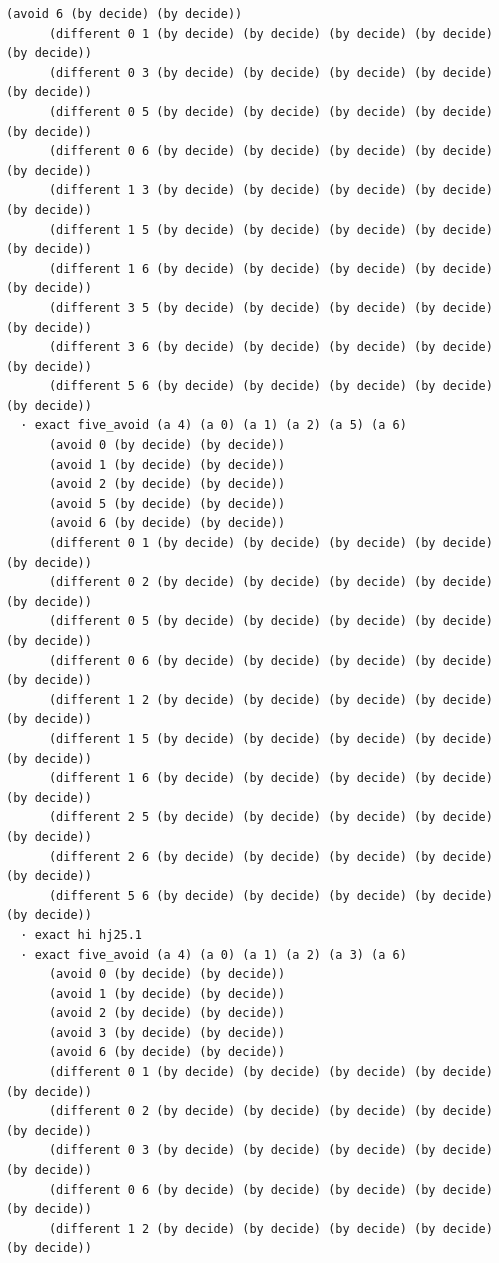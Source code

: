 \documentclass[11pt,a4paper]{article}
\begin{document}
\begin{Verbatim}[breaklines,breakanywhere,fontsize=\footnotesize]
      (avoid 6 (by decide) (by decide))
      (different 0 1 (by decide) (by decide) (by decide) (by decide) (by decide))
      (different 0 3 (by decide) (by decide) (by decide) (by decide) (by decide))
      (different 0 5 (by decide) (by decide) (by decide) (by decide) (by decide))
      (different 0 6 (by decide) (by decide) (by decide) (by decide) (by decide))
      (different 1 3 (by decide) (by decide) (by decide) (by decide) (by decide))
      (different 1 5 (by decide) (by decide) (by decide) (by decide) (by decide))
      (different 1 6 (by decide) (by decide) (by decide) (by decide) (by decide))
      (different 3 5 (by decide) (by decide) (by decide) (by decide) (by decide))
      (different 3 6 (by decide) (by decide) (by decide) (by decide) (by decide))
      (different 5 6 (by decide) (by decide) (by decide) (by decide) (by decide))
  · exact five_avoid (a 4) (a 0) (a 1) (a 2) (a 5) (a 6)
      (avoid 0 (by decide) (by decide))
      (avoid 1 (by decide) (by decide))
      (avoid 2 (by decide) (by decide))
      (avoid 5 (by decide) (by decide))
      (avoid 6 (by decide) (by decide))
      (different 0 1 (by decide) (by decide) (by decide) (by decide) (by decide))
      (different 0 2 (by decide) (by decide) (by decide) (by decide) (by decide))
      (different 0 5 (by decide) (by decide) (by decide) (by decide) (by decide))
      (different 0 6 (by decide) (by decide) (by decide) (by decide) (by decide))
      (different 1 2 (by decide) (by decide) (by decide) (by decide) (by decide))
      (different 1 5 (by decide) (by decide) (by decide) (by decide) (by decide))
      (different 1 6 (by decide) (by decide) (by decide) (by decide) (by decide))
      (different 2 5 (by decide) (by decide) (by decide) (by decide) (by decide))
      (different 2 6 (by decide) (by decide) (by decide) (by decide) (by decide))
      (different 5 6 (by decide) (by decide) (by decide) (by decide) (by decide))
  · exact hi hj25.1
  · exact five_avoid (a 4) (a 0) (a 1) (a 2) (a 3) (a 6)
      (avoid 0 (by decide) (by decide))
      (avoid 1 (by decide) (by decide))
      (avoid 2 (by decide) (by decide))
      (avoid 3 (by decide) (by decide))
      (avoid 6 (by decide) (by decide))
      (different 0 1 (by decide) (by decide) (by decide) (by decide) (by decide))
      (different 0 2 (by decide) (by decide) (by decide) (by decide) (by decide))
      (different 0 3 (by decide) (by decide) (by decide) (by decide) (by decide))
      (different 0 6 (by decide) (by decide) (by decide) (by decide) (by decide))
      (different 1 2 (by decide) (by decide) (by decide) (by decide) (by decide))

\end{Verbatim}
\end{document}
